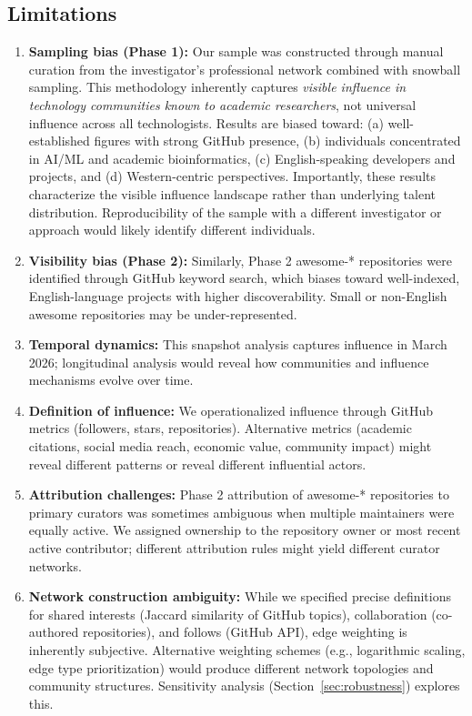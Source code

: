 \documentclass[11pt]{article}
\begin{document}
\subsection{Limitations}

\begin{enumerate}
    \item \textbf{Sampling bias (Phase 1):} Our sample was constructed through manual curation from the investigator's professional network combined with snowball sampling. This methodology inherently captures \textit{visible influence in technology communities known to academic researchers}, not universal influence across all technologists. Results are biased toward: (a) well-established figures with strong GitHub presence, (b) individuals concentrated in AI/ML and academic bioinformatics, (c) English-speaking developers and projects, and (d) Western-centric perspectives. Importantly, these results characterize the visible influence landscape rather than underlying talent distribution. Reproducibility of the sample with a different investigator or approach would likely identify different individuals.

    \item \textbf{Visibility bias (Phase 2):} Similarly, Phase 2 awesome-* repositories were identified through GitHub keyword search, which biases toward well-indexed, English-language projects with higher discoverability. Small or non-English awesome repositories may be under-represented.

    \item \textbf{Temporal dynamics:} This snapshot analysis captures influence in March 2026; longitudinal analysis would reveal how communities and influence mechanisms evolve over time.

    \item \textbf{Definition of influence:} We operationalized influence through GitHub metrics (followers, stars, repositories). Alternative metrics (academic citations, social media reach, economic value, community impact) might reveal different patterns or reveal different influential actors.

    \item \textbf{Attribution challenges:} Phase 2 attribution of awesome-* repositories to primary curators was sometimes ambiguous when multiple maintainers were equally active. We assigned ownership to the repository owner or most recent active contributor; different attribution rules might yield different curator networks.

    \item \textbf{Network construction ambiguity:} While we specified precise definitions for shared interests (Jaccard similarity of GitHub topics), collaboration (co-authored repositories), and follows (GitHub API), edge weighting is inherently subjective. Alternative weighting schemes (e.g., logarithmic scaling, edge type prioritization) would produce different network topologies and community structures. Sensitivity analysis (Section~\ref{sec:robustness}) explores this.
\end{enumerate}
\end{document}
